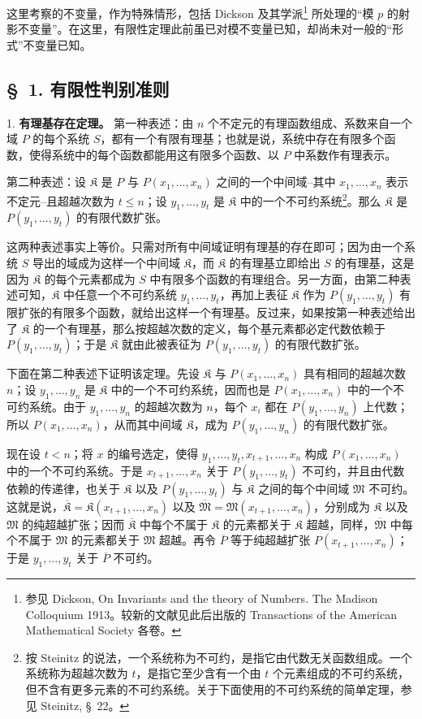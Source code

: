 这里考察的不变量，作为特殊情形，包括 Dickson 及其学派\footnote{参见 Dickson, On Invariants and the theory of Numbers. The Madison Colloquium 1913。较新的文献见此后出版的 Transactions of the American Mathematical Society 各卷。} 所处理的“模 $p$ 的射影不变量”。在这里，有限性定理此前虽已对模不变量已知，却尚未对一般的“形式”不变量已知。

\subsection*{\S\ 1. 有限性判别准则}

1. \textbf{有理基存在定理。} 第一种表述：由 $n$ 个不定元的有理函数组成、系数来自一个域 $P$ 的每个系统 $S$，都有一个有限有理基；也就是说，系统中存在有限多个函数，使得系统中的每个函数都能用这有限多个函数、以 $P$ 中系数作有理表示。

第二种表述：设 $\mathfrak K$ 是 $P$ 与 $P(x_1,\ldots,x_n)$ 之间的一个中间域--其中 $x_1,\ldots,x_n$ 表示不定元--且超越次数为 $t\leq n$；设 $y_1,\ldots,y_t$ 是 $\mathfrak K$ 中的一个不可约系统\footnote{按 Steinitz 的说法，一个系统称为不可约，是指它由代数无关函数组成。一个系统称为超越次数为 $t$，是指它至少含有一个由 $t$ 个元素组成的不可约系统，但不含有更多元素的不可约系统。关于下面使用的不可约系统的简单定理，参见 Steinitz, \S\ 22。}。那么 $\mathfrak K$ 是 $P(y_1,\ldots,y_t)$ 的有限代数扩张。

这两种表述事实上等价。只需对所有中间域证明有理基的存在即可；因为由一个系统 $S$ 导出的域成为这样一个中间域 $\mathfrak K$，而 $\mathfrak K$ 的有理基立即给出 $S$ 的有理基，这是因为 $\mathfrak K$ 的每个元素都成为 $S$ 中有限多个函数的有理组合。另一方面，由第二种表述可知，$\mathfrak K$ 中任意一个不可约系统 $y_1,\ldots,y_t$，再加上表征 $\mathfrak K$ 作为 $P(y_1,\ldots,y_t)$ 有限扩张的有限多个函数，就给出这样一个有理基。反过来，如果按第一种表述给出了 $\mathfrak K$ 的一个有理基，那么按超越次数的定义，每个基元素都必定代数依赖于 $P(y_1,\ldots,y_t)$；于是 $\mathfrak K$ 就由此被表征为 $P(y_1,\ldots,y_t)$ 的有限代数扩张。

下面在第二种表述下证明该定理。先设 $\mathfrak K$ 与 $P(x_1,\ldots,x_n)$ 具有相同的超越次数 $n$；设 $y_1,\ldots,y_n$ 是 $\mathfrak K$ 中的一个不可约系统，因而也是 $P(x_1,\ldots,x_n)$ 中的一个不可约系统。由于 $y_1,\ldots,y_n$ 的超越次数为 $n$，每个 $x_i$ 都在 $P(y_1,\ldots,y_n)$ 上代数；所以 $P(x_1,\ldots,x_n)$，从而其中间域 $\mathfrak K$，成为 $P(y_1,\ldots,y_n)$ 的有限代数扩张。

现在设 $t<n$；将 $x$ 的编号选定，使得 $y_1,\ldots,y_t,x_{t+1},\ldots,x_n$ 构成 $P(x_1,\ldots,x_n)$ 中的一个不可约系统。于是 $x_{t+1},\ldots,x_n$ 关于 $P(y_1,\ldots,y_t)$ 不可约，并且由代数依赖的传递律，也关于 $\mathfrak K$ 以及 $P(y_1,\ldots,y_t)$ 与 $\mathfrak K$ 之间的每个中间域 $\mathfrak M$ 不可约。这就是说，$\overline{\mathfrak K}=\mathfrak K(x_{t+1},\ldots,x_n)$ 以及 $\overline{\mathfrak M}=\mathfrak M(x_{t+1},\ldots,x_n)$，分别成为 $\mathfrak K$ 以及 $\mathfrak M$ 的纯超越扩张；因而 $\overline{\mathfrak K}$ 中每个不属于 $\mathfrak K$ 的元素都关于 $\mathfrak K$ 超越，同样，$\overline{\mathfrak M}$ 中每个不属于 $\mathfrak M$ 的元素都关于 $\mathfrak M$ 超越。再令 $\overline P$ 等于纯超越扩张 $P(x_{t+1},\ldots,x_n)$；于是 $y_1,\ldots,y_t$ 关于 $\overline P$ 不可约。

